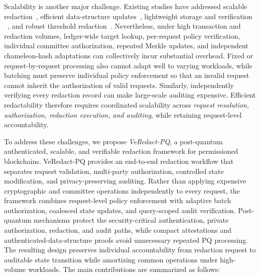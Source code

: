 \documentclass[lettersize,journal]{IEEEtran}
\begin{document}
    Scalability is another major challenge. Existing studies have addressed
    scalable redaction~\cite{ref14,ref21,ref26}, efficient data-structure
    updates~\cite{ref23}, lightweight storage and verification
    ~\cite{ref20}, and robust threshold redaction~\cite{ref27}.
    Nevertheless, under high transaction and redaction volumes,
    ledger-wide target lookup, per-request policy verification, individual
    committee authorization, repeated Merkle updates, and independent
    chameleon-hash adaptations can collectively incur substantial
    overhead. Fixed or request-by-request processing also cannot adapt well
    to varying workloads, while batching must preserve individual policy
    enforcement so that an invalid request cannot inherit the authorization
    of valid requests. Similarly, independently verifying every redaction
    record can make large-scale auditing expensive. Efficient redactability
    therefore requires coordinated scalability across \emph{request
    resolution, authorization, redaction execution, and auditing}, while
    retaining request-level accountability.
    
    To address these challenges, we propose \emph{VeRedact-PQ}, a
    post-quantum authenticated, scalable, and verifiable redaction
    framework for permissioned blockchains. VeRedact-PQ provides an
    end-to-end redaction workflow that separates request validation,
    multi-party authorization, controlled state modification, and
    privacy-preserving auditing. Rather than applying expensive
    cryptographic and committee operations independently to every request,
    the framework combines request-level policy enforcement with adaptive
    batch authorization, coalesced state updates, and query-scoped audit
    verification. Post-quantum mechanisms protect the security-critical
    authentication, private authorization, redaction, and audit paths,
    while compact attestations and authenticated-data-structure proofs
    avoid unnecessary repeated PQ processing. The resulting design
    preserves individual accountability from redaction request to
    auditable state transition while amortizing common operations under
    high-volume workloads.
    The main contributions are summarized as follows:
    
\end{document}
